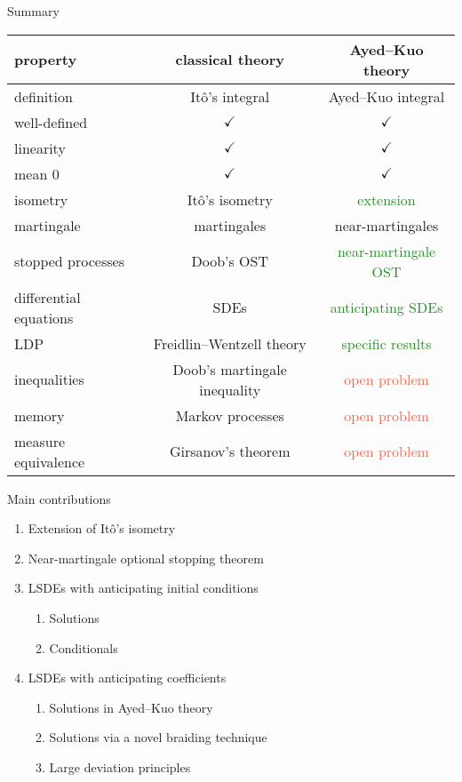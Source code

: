 \documentclass[
    t,
    aspectratio=169,
    xcolor={
        svgnames,
        table,
        hyperref,
    },
    hyperref={
        pdfusetitle,    %
        pdfauthor={Sudip Sinha},    %
        pdfsubject={doctoral defense},    %
        pdfkeywords={defense, dissertation, thesis, doctorate},    %
        pdfstartview=Fit,    %
        pdfpagelayout=SinglePage,    %
        bookmarks=true,
        unicode=true,
        colorlinks=true,
        linktoc=all,
        hyperfootnotes=false,
        breaklinks=true,    %
        linkcolor=Navy,
        urlcolor=IndianRed,
        citecolor=structure.fg,
    },
]{beamer}
\theoremstyle{definition}
\newcommand{\good}[1]{\textcolor{ForestGreen}{#1}}
\newcommand{\bad}[1]{\textcolor{Tomato}{#1}}
\begin{document}
\begin{frame}{Summary}
    \begin{table}[ht]
        \begin{tabular}{lcc}
            \toprule
            property  &  classical theory  &  Ayed–Kuo theory  \\
            \midrule
            definition  &  Itô's integral   &  Ayed–Kuo integral  \\
            well-defined  &  \( ✓ \)  &  \( ✓ \)  \\
            linearity  &  \( ✓ \)  &  \( ✓ \)  \\
            mean \( 0 \)  &  \( ✓ \)  &  \( ✓ \)  \\
            isometry  &  Itô's isometry  &  \good{extension}  \\
            martingale  &  martingales  &  near-martingales  \\
            stopped processes  &  Doob's OST  &  \good{near-martingale OST}  \\
            differential equations  &  SDEs  &  \good{anticipating SDEs}  \\
            LDP  &  Freidlin–Wentzell theory  &  \good{specific results}  \\
            inequalities  &  Doob's martingale inequality  &  \bad{open problem}  \\
            memory  &  Markov processes  &  \bad{open problem}  \\
            measure equivalence  &  Girsanov's theorem  &  \bad{open problem}  \\
            \bottomrule
        \end{tabular}
    \end{table}
\end{frame}

\begin{frame}{Main contributions}
    \begin{enumerate}
        \item  Extension of Itô's isometry
        \item  Near-martingale optional stopping theorem
        \item  LSDEs with anticipating initial conditions
        \begin{enumerate}
            \item  Solutions
            \item  Conditionals
        \end{enumerate}
        \item  LSDEs with anticipating coefficients
        \begin{enumerate}
            \item  Solutions in Ayed–Kuo theory
            \item  Solutions via a novel braiding technique
            \item  Large deviation principles
        \end{enumerate}
    \end{enumerate}
\end{frame}
\end{document}
